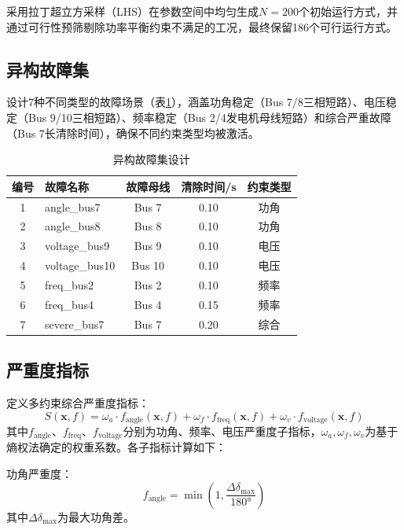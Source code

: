 \documentclass[a4paper,11pt]{ctexart}
\newcommand{\bx}{\mathbf{x}}
\begin{document}
采用拉丁超立方采样（LHS）\cite{mckay1979lhs}在参数空间中均匀生成$N = 200$个初始运行方式，并通过可行性预筛剔除功率平衡约束不满足的工况，最终保留186个可行运行方式。

\subsection{异构故障集}

设计7种不同类型的故障场景（表\ref{tab:fault_set}），涵盖功角稳定（Bus 7/8三相短路）、电压稳定（Bus 9/10三相短路）、频率稳定（Bus 2/4发电机母线短路）和综合严重故障（Bus 7长清除时间），确保不同约束类型均被激活。

\begin{table}[htbp]
\centering
\caption{异构故障集设计}
\label{tab:fault_set}
\begin{tabular}{clccc}
\toprule
编号 & 故障名称 & 故障母线 & 清除时间/s & 约束类型 \\
\midrule
1 & angle\_bus7 & Bus 7 & 0.10 & 功角 \\
2 & angle\_bus8 & Bus 8 & 0.10 & 功角 \\
3 & voltage\_bus9 & Bus 9 & 0.10 & 电压 \\
4 & voltage\_bus10 & Bus 10 & 0.10 & 电压 \\
5 & freq\_bus2 & Bus 2 & 0.10 & 频率 \\
6 & freq\_bus4 & Bus 4 & 0.15 & 频率 \\
7 & severe\_bus7 & Bus 7 & 0.20 & 综合 \\
\bottomrule
\end{tabular}
\end{table}

\subsection{严重度指标}

定义多约束综合严重度指标：
\begin{equation}
    S(\bx, f) = \omega_a \cdot f_{\text{angle}}(\bx, f) + \omega_f \cdot f_{\text{freq}}(\bx, f) + \omega_v \cdot f_{\text{voltage}}(\bx, f)
    \label{eq:severity}
\end{equation}
其中$f_{\text{angle}}$、$f_{\text{freq}}$、$f_{\text{voltage}}$分别为功角、频率、电压严重度子指标，$\omega_a, \omega_f, \omega_v$为基于熵权法\cite{liu2018fast_scanning}确定的权重系数。各子指标计算如下：

功角严重度：
\begin{equation}
    f_{\text{angle}} = \min\left(1, \frac{\Delta\delta_{\max}}{180°}\right)
    \label{eq:f_angle}
\end{equation}
其中$\Delta\delta_{\max}$为最大功角差。
\end{document}
